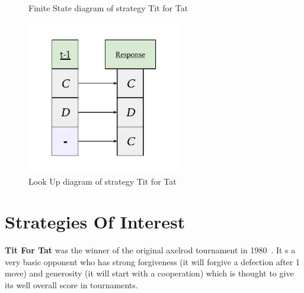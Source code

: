 \begin{figure}[ht]
    \centering
    \begin{minipage}{0.48\textwidth}
        \centering
        \caption{Finite State diagram of strategy Tit for Tat}\label{fig:tit_for_tat_FSD}
    \end{minipage}\hfill
    \begin{minipage}{0.48\textwidth}
        \centering
        \includegraphics[width=0.6\textwidth, center]{./img/examples/tit_for_tat_LUD.pdf}
        \caption{Look Up diagram of strategy Tit for Tat}\label{fig:tit_for_tat_LUD}
    \end{minipage}
\end{figure}


\section{Strategies Of Interest}\label{sec:strategiesOfInterest}
\textbf{Tit For Tat} was the winner of the original axelrod tournament in 1980~\cite{axelrod1980effective}. It s a very basic opponent who has strong forgiveness (it will forgive a defection after 1 move) and generosity (it will start with a cooperation) which is thought to give its well overall score in tournaments.

